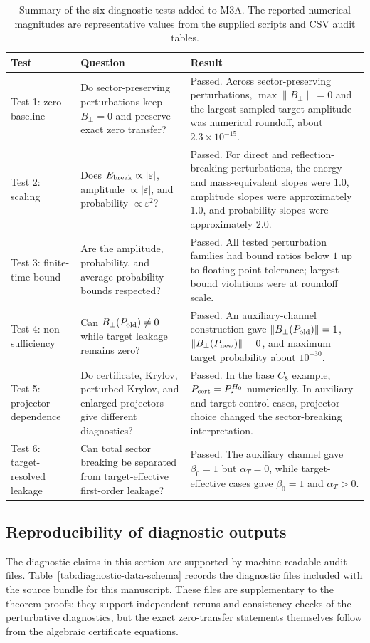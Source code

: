 \documentclass[11pt]{article}
\theoremstyle{definition}
\begin{document}
\begin{table}[H]
\centering
\caption{Summary of the six diagnostic tests added to M3A. The reported numerical magnitudes are representative values from the supplied scripts and CSV audit tables.}
\begin{tabular}{p{}p{}p{}}
\toprule
Test & Question & Result\\
\midrule
Test 1: zero baseline & Do sector-preserving perturbations keep $B_\perp=0$ and preserve exact zero transfer? & Passed. Across sector-preserving perturbations, $\max\|B_\perp\|=0$ and the largest sampled target amplitude was numerical roundoff, about $2.3\times10^{-15}$.\\
Test 2: scaling & Does $E_{\rm break}\propto |\varepsilon|$, amplitude $\propto|\varepsilon|$, and probability $\propto\varepsilon^2$? & Passed. For direct and reflection-breaking perturbations, the energy and mass-equivalent slopes were $1.0$, amplitude slopes were approximately $1.0$, and probability slopes were approximately $2.0$.\\
Test 3: finite-time bound & Are the amplitude, probability, and average-probability bounds respected? & Passed. All tested perturbation families had bound ratios below $1$ up to floating-point tolerance; largest bound violations were at roundoff scale.\\
Test 4: non-sufficiency & Can $B_\perp(P_{\rm old})\ne0$ while target leakage remains zero? & Passed. An auxiliary-channel construction gave $\|B_\perp(P_{\rm old})\|=1$, $\|B_\perp(P_{\rm new})\|=0$, and maximum target probability about $10^{-30}$.\\
Test 5: projector dependence & Do certificate, Krylov, perturbed Krylov, and enlarged projectors give different diagnostics? & Passed. In the base $C_8$ example, $P_{\rm cert}=P_s^{H_0}$ numerically. In auxiliary and target-control cases, projector choice changed the sector-breaking interpretation.\\
Test 6: target-resolved leakage & Can total sector breaking be separated from target-effective first-order leakage? & Passed. The auxiliary channel gave $\beta_0=1$ but $\alpha_T=0$, while target-effective cases gave $\beta_0=1$ and $\alpha_T>0$.\\
\bottomrule
\end{tabular}
\end{table}

\subsection{Reproducibility of diagnostic outputs}
The diagnostic claims in this section are supported by machine-readable audit files. Table~\ref{tab:diagnostic-data-schema} records the diagnostic files included with the source bundle for this manuscript. These files are supplementary to the theorem proofs: they support independent reruns and consistency checks of the perturbative diagnostics, but the exact zero-transfer statements themselves follow from the algebraic certificate equations.
\end{document}
